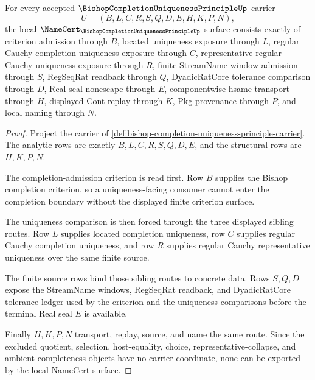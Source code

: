 \begin{theorem}
\label{thm:bishop-completion-uniqueness-principle-namecert-obligations}
For every accepted $\BishopCompletionUniquenessPrincipleUp$ carrier
$$
U=(B,L,C,R,S,Q,D,E,H,K,P,N),
$$
the local $\NameCert_{\BishopCompletionUniquenessPrincipleUp}$ surface consists exactly of criterion admission through $B$, located uniqueness exposure through $L$, regular Cauchy completion uniqueness exposure through $C$, representative regular Cauchy uniqueness exposure through $R$, finite StreamName window admission through $S$, RegSeqRat readback through $Q$, DyadicRatCore tolerance comparison through $D$, Real seal nonescape through $E$, componentwise hsame transport through $H$, displayed Cont replay through $K$, Pkg provenance through $P$, and local naming through $N$.
\end{theorem}
\begin{proof}
Project the carrier of \autoref{def:bishop-completion-uniqueness-principle-carrier}. The analytic rows are exactly $B,L,C,R,S,Q,D,E$, and the structural rows are $H,K,P,N$.

The completion-admission criterion is read first. Row $B$ supplies the Bishop completion criterion, so a uniqueness-facing consumer cannot enter the completion boundary without the displayed finite criterion surface.

The uniqueness comparison is then forced through the three displayed sibling routes. Row $L$ supplies located completion uniqueness, row $C$ supplies regular Cauchy completion uniqueness, and row $R$ supplies regular Cauchy representative uniqueness over the same finite source.

The finite source rows bind those sibling routes to concrete data. Rows $S,Q,D$ expose the StreamName windows, RegSeqRat readback, and DyadicRatCore tolerance ledger used by the criterion and the uniqueness comparisons before the terminal Real seal $E$ is available.

Finally $H,K,P,N$ transport, replay, source, and name the same route. Since the excluded quotient, selection, host-equality, choice, representative-collapse, and ambient-completeness objects have no carrier coordinate, none can be exported by the local NameCert surface.
\end{proof}

